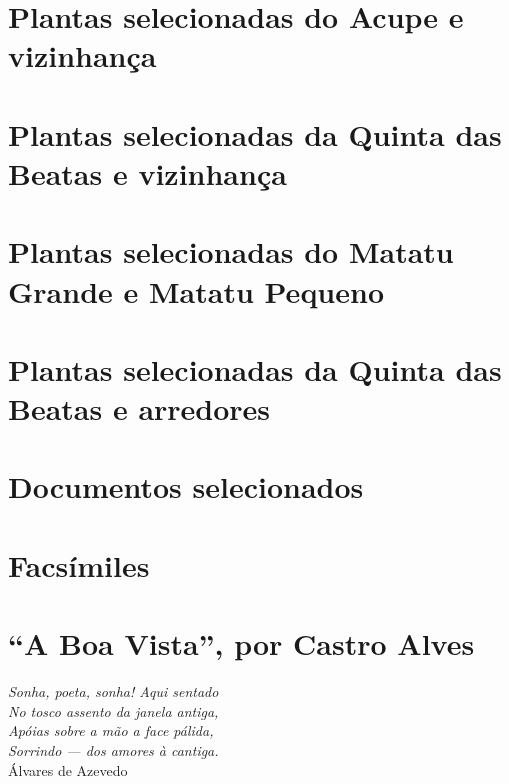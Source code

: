 \begin{anexosenv}
\chapter{Plantas selecionadas do Acupe e vizinhança}




\chapter{Plantas selecionadas da Quinta das Beatas e vizinhança}




\chapter{Plantas selecionadas do Matatu Grande e Matatu Pequeno}




\chapter{Plantas selecionadas da Quinta das Beatas e arredores}








\chapter{Documentos selecionados}




\chapter{Facsímiles}


\chapter{``A Boa Vista'', por Castro Alves}\label{cap:boavista}

\settowidth{\versewidth}{}

\begin{flushright}
\textit{Sonha, poeta, sonha! Aqui sentado \\
No tosco assento da janela antiga,\\
Apóias sobre a mão a face pálida,\\
Sorrindo — dos amores à cantiga.}\\
Álvares de Azevedo
\end{flushright}


\end{anexosenv}
